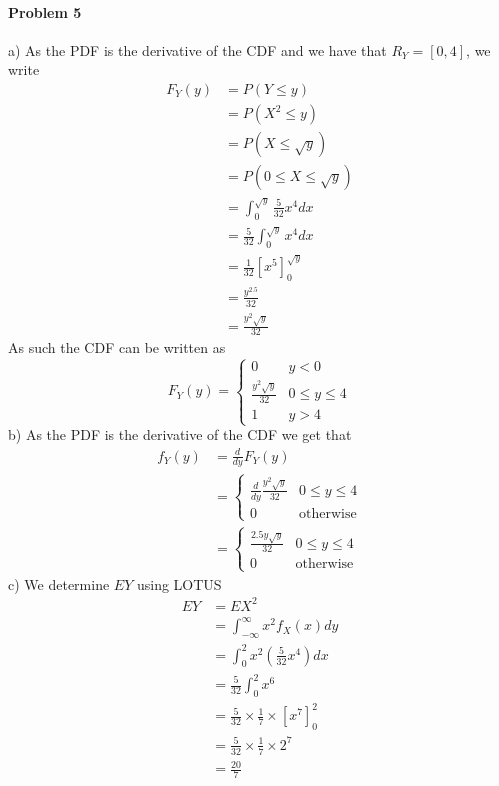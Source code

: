 \paragraph{Problem 5}
a)
As the PDF is the derivative of the CDF and we have that $R_{Y}=[0,4]$, we write
\begin{align*}
    F_{Y}(y)&=P(Y\leq y) \\
            &=P(X^{2}\leq y) \\
            &=P(X\leq\sqrt{y}) \\
            &=P(0\leq X\leq\sqrt{y}) \\
            &=\int_{0}^{\sqrt{y}}\frac{5}{32}x^{4}dx \\
            &=\frac{5}{32}\int_{0}^{\sqrt{y}}x^{4}dx \\
            &=\frac{1}{32}\left[x^{5}\right]_{0}^{\sqrt{y}} \\
            &=\frac{y^{2.5}}{32} \\
            &=\frac{y^{2}\sqrt{y}}{32}
\end{align*}
As such the CDF can be written as
\[
    F_{Y}(y)=\begin{cases}0 & y<0 \\ \frac{y^{2}\sqrt{y}}{32} & 0\leq y\leq 4 \\ 1 & y>4\end{cases}
\]
b)
As the PDF is the derivative of the CDF we get that
\begin{align*}
    f_{Y}(y)&=\frac{d}{dy}F_{Y}(y) \\
            &=\begin{cases}\frac{d}{dy}\frac{y^{2}\sqrt{y}}{32} & 0\leq y\leq 4 \\ 0 & \text{otherwise}\end{cases} \\
            &=\begin{cases}\frac{2.5y\sqrt{y}}{32} & 0\leq y\leq 4 \\ 0 & \text{otherwise}\end{cases}
\end{align*}
c)
We determine $EY$ using LOTUS
\begin{align*}
    EY&=EX^{2} \\
      &=\int_{-\infty}^{\infty}x^{2}f_{X}(x)dy \\
      &=\int_{0}^{2}x^{2}\left(\frac{5}{32}x^{4}\right)dx \\
      &=\frac{5}{32}\int_{0}^{2}x^{6} \\
      &=\frac{5}{32}\times\frac{1}{7}\times\left[x^{7}\right]_{0}^{2} \\
      &=\frac{5}{32}\times\frac{1}{7}\times 2^{7} \\
      &=\frac{20}{7}
\end{align*}
